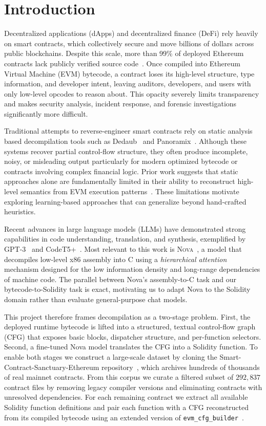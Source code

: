 \documentclass{article}
\begin{document}
\section{Introduction}

Decentralized applications (dApps) and decentralized finance (DeFi) rely heavily
on smart contracts, which collectively secure and move billions of dollars across
public blockchains. Despite this scale, more than 99\% of deployed Ethereum
contracts lack publicly verified source code~\cite{etherscan}. Once compiled into
Ethereum Virtual Machine (EVM) bytecode, a contract loses its high-level
structure, type information, and developer intent, leaving auditors, developers,
and users with only low-level opcodes to reason about. This opacity severely
limits transparency and makes security analysis, incident response, and forensic
investigations significantly more difficult.

Traditional attempts to reverse-engineer smart contracts rely on
static analysis based decompilation tools such as Dedaub~\cite{neville2023dedaub}
and Panoramix~\cite{panoramix}. Although these systems recover partial
control-flow structure, they often produce incomplete, noisy, or misleading
output particularly for modern optimized bytecode or contracts involving complex
financial logic. Prior work suggests that static approaches alone are
fundamentally limited in their ability to reconstruct high-level semantics from
EVM execution patterns~\cite{darwish2023bytecode}. These limitations motivate
exploring learning-based approaches that can generalize beyond hand-crafted
heuristics.

Recent advances in large language models (LLMs) have demonstrated strong
capabilities in code understanding, translation, and synthesis, exemplified by
GPT-3~\cite{brown2020language} and CodeT5+~\cite{wang2023codet5plus}. Most
relevant to this work is \textsc{Nova}~\cite{jiang2025nova}, a model that
decompiles low-level x86 assembly into C using a \emph{hierarchical attention}
mechanism designed for the low information density and long-range dependencies of
machine code. The parallel between Nova's assembly-to-C task and our
bytecode-to-Solidity task is exact, motivating us to adapt Nova to the Solidity
domain rather than evaluate general-purpose chat models.

This project therefore frames decompilation as a two-stage problem. First, the
deployed runtime bytecode is lifted into a structured, textual control-flow graph
(CFG) that exposes basic blocks, dispatcher structure, and per-function selectors.
Second, a fine-tuned Nova model translates the CFG into a Solidity function. To
enable both stages we construct a large-scale dataset by cloning the
Smart-Contract-Sanctuary-Ethereum repository~\cite{smart_contract_sanctuary},
which archives hundreds of thousands of real mainnet contracts. From this corpus
we curate a filtered subset of $292{,}837$ contract files by removing legacy
compiler versions and eliminating contracts with unresolved dependencies. For
each remaining contract we extract all available Solidity function definitions and
pair each function with a CFG reconstructed from its compiled bytecode using an
extended version of \texttt{evm\_cfg\_builder}~\cite{evm_cfg_builder}.
\end{document}
